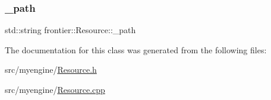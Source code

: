 \subsubsection{\texorpdfstring{\+\_\+path}{\_path}}
{\footnotesize\ttfamily std\+::string frontier\+::\+Resource\+::\+\_\+path\hspace{0.3cm}{\ttfamily [protected]}}



The documentation for this class was generated from the following files\+:\begin{DoxyCompactItemize}
\item 
src/myengine/\hyperlink{_resource_8h}{Resource.\+h}\item 
src/myengine/\hyperlink{_resource_8cpp}{Resource.\+cpp}\end{DoxyCompactItemize}
